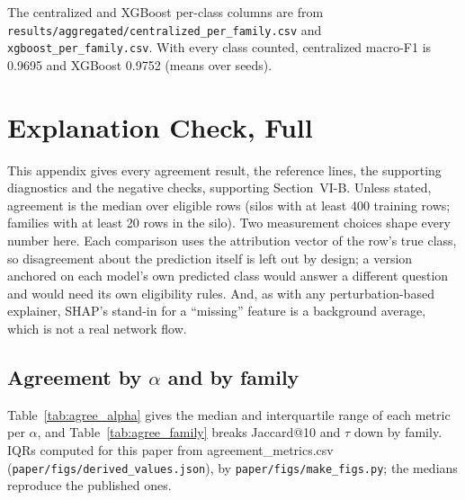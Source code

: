 The centralized and XGBoost per-class columns are from
\texttt{results/aggregated/centralized\_per\_family.csv} and
\texttt{xgboost\_per\_family.csv}. With every class counted, centralized macro-F1 is
0.9695 and XGBoost 0.9752 (means over seeds). %

\section{Explanation Check, Full}
\label{app:expl}
This appendix gives every agreement result, the reference lines, the supporting
diagnostics and the negative checks, supporting Section~VI-B. Unless stated, agreement
is the median over eligible rows (silos with at least 400 training rows; families with %
at least 20 rows in the silo). %
Two measurement choices shape every number here. Each comparison uses the attribution
vector of the row's true class, so disagreement about the prediction itself is left out
by design; a version anchored on each model's own predicted class would answer a
different question and would need its own eligibility rules. And, as with any
perturbation-based explainer, SHAP's stand-in for a ``missing'' feature is a background
average, which is not a real network flow.

\subsection{Agreement by $\alpha$ and by family}
Table~\ref{tab:agree_alpha} gives the median and interquartile range of each metric per
$\alpha$, and Table~\ref{tab:agree_family} breaks Jaccard@10 and $\tau$ down by family.
IQRs computed for this paper from agreement\_metrics.csv
(\texttt{paper/figs/derived\_values.json}), by \texttt{paper/figs/make\_figs.py}; the
medians reproduce the published ones.

